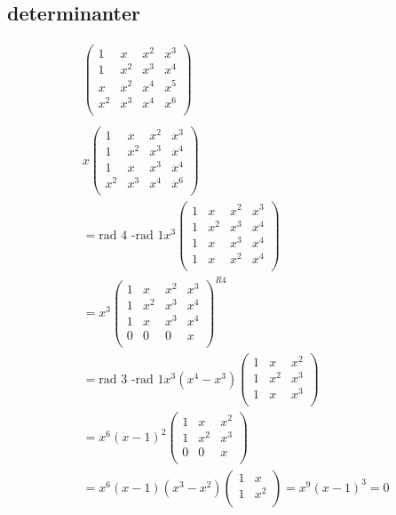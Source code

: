 \begin{multicols}{2}
\subsection{determinanter}
\begin{align*}
  &\left(\begin{array}{cccc}
    1   & x   & x^2 & x^3  \\
    1   & x^2 & x^3 & x^4  \\
    x   & x^2 & x^4 & x^5  \\
    x^2 & x^3 & x^4 & x^6  \\
  \end{array}\right) \\
  &\\
  &x
  \left(\begin{array}{cccc}
    1   & x   & x^2 & x^3  \\
    1   & x^2 & x^3 & x^4  \\
    1   & x   & x^3 & x^4  \\
    x^2 & x^3 & x^4 & x^6  \\
  \end{array}\right) \\
  &= \text{rad 4 -rad 1} x^3  
  \left(\begin{array}{cccc}
    1   & x   & x^2 & x^3  \\
    1   & x^2 & x^3 & x^4  \\
    1   & x   & x^3 & x^4  \\
    1   & x   & x^2 & x^4  \\
  \end{array}\right) \\
  &=  x^3
  \left(\begin{array}{cccc}
    1   & x   & x^2 & x^3  \\
    1   & x^2 & x^3 & x^4  \\
    1   & x   & x^3 & x^4  \\
    0   & 0   & 0 & x     \\
  \end{array}\right)^{R4}  \\
  &= \text{rad 3 -rad 1} x^3(x^4-x^3)
  \left(\begin{array}{ccc}
    1   & x   & x^2  \\
    1   & x^2 & x^3  \\
    1   & x   & x^3  \\
  \end{array}\right) \\
  &= x^6(x-1)^2
  \left(\begin{array}{ccc}
    1   & x   & x^2  \\
    1   & x^2 & x^3  \\
    0   & 0   & x  \\
  \end{array}\right)  \\
  &= x^6(x-1)(x^3-x^2)  
  \left(\begin{array}{cc}
    1   & x    \\
    1   & x^2  \\
  \end{array}\right) = x^9(x-1)^3=0
\end{align*}


\end{multicols}
